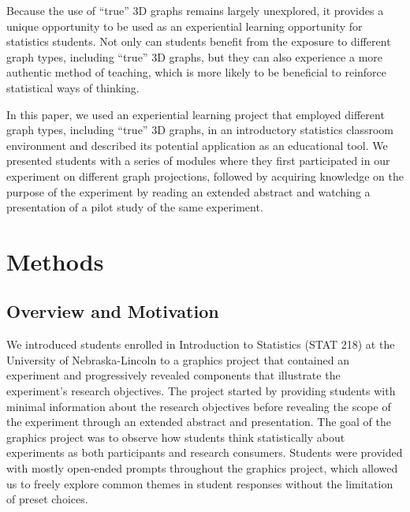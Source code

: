 \documentclass[
  12pt,
]{article}
\providecommand{\DIFdel}[1]{} %
\providecommand{\DIFadd}[1]{{\protect\color{blue} \sf #1}} %
\providecommand{\DIFdel}[1]{{\protect\color{red} [..\footnote{removed: #1} ]}} %
\providecommand{\DIFaddbegin}{} %
\providecommand{\DIFaddend}{} %
\providecommand{\DIFdelbegin}{} %
\providecommand{\DIFdelend}{} %
\newcommand{\DIFscaledelfig}{0.5}
\newlength{\DIFdelgraphicswidth} %
\newlength{\DIFdelgraphicsheight} %
\newcommand{\DIFaddincludegraphics}[2][]{{\color{blue}\fbox{\DIFOincludegraphics[#1]{#2}}}} %
\newcommand{\DIFdelincludegraphics}[2][]{%
\sbox{\DIFdelgraphicsbox}{\DIFOincludegraphics[#1]{#2}}%
\settoboxwidth{\DIFdelgraphicswidth}{\DIFdelgraphicsbox} %
\settoboxtotalheight{\DIFdelgraphicsheight}{\DIFdelgraphicsbox} %
\scalebox{\DIFscaledelfig}{%
\parbox[b]{\DIFdelgraphicswidth}{\usebox{\DIFdelgraphicsbox}\\[-\baselineskip] \rule{\DIFdelgraphicswidth}{0em}}\llap{\resizebox{\DIFdelgraphicswidth}{\DIFdelgraphicsheight}{%
\setlength{\unitlength}{\DIFdelgraphicswidth}%
\begin{picture}(1,1)%
\thicklines\linethickness{2pt} %
{\color[rgb]{1,0,0}\put(0,0){\framebox(1,1){}}}%
{\color[rgb]{1,0,0}\put(0,0){\line( 1,1){1}}}%
{\color[rgb]{1,0,0}\put(0,1){\line(1,-1){1}}}%
\end{picture}%
}\hspace*{3pt}}} %
} %
\DeclareRobustCommand{\DIFaddbegin}{\DIFOaddbegin \let\includegraphics\DIFaddincludegraphics} %
\DeclareRobustCommand{\DIFaddend}{\DIFOaddend \let\includegraphics\DIFOincludegraphics} %
\DeclareRobustCommand{\DIFdelbegin}{\DIFOdelbegin \let\includegraphics\DIFdelincludegraphics} %
\DeclareRobustCommand{\DIFdelend}{\DIFOaddend \let\includegraphics\DIFOincludegraphics} %
\begin{document}
Because the use of ``true'' 3D graphs remains largely unexplored, it
provides a unique opportunity to be used as an experiential learning
opportunity for statistics students. Not only can students benefit from
the exposure to different graph types, including ``true'' 3D graphs, but
they can also experience a more authentic method of teaching, which is
more likely to be beneficial to reinforce statistical ways of thinking.

In this paper, we used an experiential learning project that employed
different graph types, including ``true'' 3D graphs, in an introductory
statistics classroom environment and \DIFdelbegin \DIFdel{describe }\DIFdelend \DIFaddbegin \DIFadd{described }\DIFaddend its potential application
as an educational tool. We presented students with a series of modules
where they first participated in our experiment on different graph
\DIFdelbegin \DIFdel{types}\DIFdelend \DIFaddbegin \DIFadd{projections}\DIFaddend , followed by acquiring knowledge on the purpose of the
experiment by reading an extended abstract and watching a presentation
of a pilot study of the same experiment.

\section{Methods}\label{methods}

\DIFaddbegin \subsection{\DIFadd{Overview and Motivation}}\label{overview-and-motivation}

\DIFaddend We introduced students enrolled in Introduction to Statistics (STAT 218)
at the University of Nebraska-Lincoln to a graphics project that
contained an experiment and progressively \DIFdelbegin \DIFdel{revealing }\DIFdelend \DIFaddbegin \DIFadd{revealed }\DIFaddend components that
illustrate the experiment's research objectives. The project started by
providing students with minimal information about the research
objectives before revealing the scope of the experiment through an
extended abstract and presentation. The goal of the graphics project was
to observe how students think statistically about experiments as both
participants and research consumers. Students were provided with mostly
open-ended prompts throughout the graphics project, which allowed us to
freely explore common themes in student responses without the limitation
of preset choices.
\end{document}
